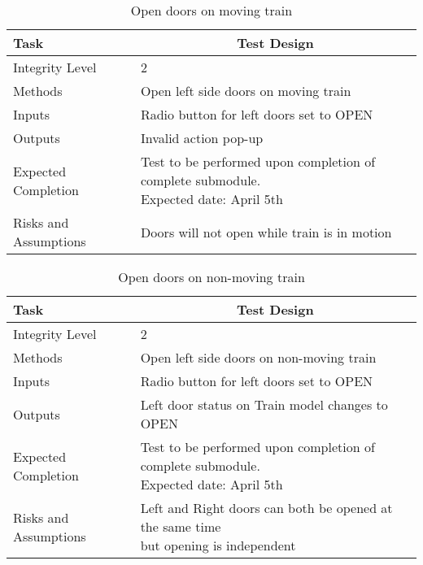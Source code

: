 \documentclass[]{article}
\begin{document}
	\begin{table}[H]
		\centering
		\caption{Open doors on moving train}
		\begin{tabular}{|l|l|}
			\hline
			Task & \multicolumn{1}{c|}{Test Design} \\ \hline
			Integrity Level & 2 \\ \hline
			Methods & Open left side doors on moving train  \\ \hline
			Inputs &  Radio button for left doors set to OPEN \\ \hline
			Outputs & Invalid action pop-up\\ \hline
			Expected Completion & \parbox[t]{10cm}{Test to be performed upon completion of complete submodule.\\ Expected date: April 5th}\\ \hline
			Risks and Assumptions & Doors will not open while train is in motion\\ \hline
		\end{tabular}
	\end{table}

	\begin{table}[H]
		\centering
		\caption{Open doors on non-moving train}
		\begin{tabular}{|l|l|}
			\hline
			Task & \multicolumn{1}{c|}{Test Design} \\ \hline
			Integrity Level & 2 \\ \hline
			Methods & Open left side doors on non-moving train  \\ \hline
			Inputs &  Radio button for left doors set to OPEN \\ \hline
			Outputs & Left door status on Train model changes to OPEN\\ \hline
			Expected Completion & \parbox[t]{10cm}{Test to be performed upon completion of complete submodule.\\ Expected date: April 5th}\\ \hline
			Risks and Assumptions &\parbox[t]{10cm}{ Left and Right doors can both be opened at the same time \\ but opening is independent}\\ \hline
		\end{tabular}
	\end{table}
\end{document}
